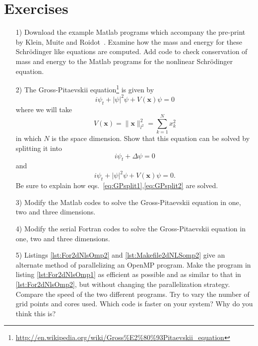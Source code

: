 \section{Exercises}
\begin{enumerate}
\item[1)] Download the example Matlab programs which accompany the pre-print by Klein, Muite and Roidot~\cite{KleMuiRoi11}. Examine how the mass and energy for these Schr\"{o}dinger like equations are computed. Add code to check conservation of mass and energy to the Matlab programs for the nonlinear Schr\"{o}dinger equation.
\item[2)] The Gross-Pitaevskii equation\footnote{\url{http://en.wikipedia.org/wiki/Gross\%E2\%80\%93Pitaevskii\_equation}}  is given by
\begin{equation}
i\psi_t+\lvert\psi\rvert^2\psi +V(\bm x)\psi=0
\end{equation}
where we will take
\begin{equation}
V(\bm x)=\lVert \bm x \rVert^2_{l^2}=\sum_{k=1}^Nx_k^2
\end{equation}
in which $N$ is the space dimension. Show that this equation can be solved by splitting it into
\begin{equation}
i\psi_t+\Delta\psi=0 \label{eq:GPsplit1}
\end{equation}
and
\begin{equation}
i\psi_t+\lvert\psi\rvert^2\psi+V(\bm x)\psi=0.  \label{eq:GPsplit2}
\end{equation}
Be sure to explain how eqs.\ \eqref{eq:GPsplit1},\eqref{eq:GPsplit2} are solved. 
\item[3)] Modify the Matlab codes to solve the Gross-Pitaevskii equation in one, two and three dimensions.
\item[4)] Modify the serial Fortran codes to solve the Gross-Pitaevskii equation in one, two and three dimensions.
\item[5)] Listings \ref{lst:For2dNlsOmp2} and \ref{lst:Makefile2dNLSomp2} give an alternate method of parallelizing an OpenMP program. Make the program in listing \ref{lst:For2dNlsOmp1} as efficient as possible and as similar to that in \ref{lst:For2dNlsOmp2}, but without changing the parallelization strategy. Compare the speed of the two different programs. Try to vary the number of grid points and cores used. Which code is faster on your system? Why do you think this is?




\end{enumerate}
